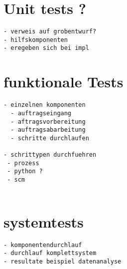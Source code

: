 \section{Unit tests ?}


\begin{verbatim}
- verweis auf grobentwurf?
- hilfskomponenten
- eregeben sich bei impl
\end{verbatim}

\section{funktionale Tests}

\begin{verbatim}
- einzelnen komponenten
  - auftragseingang
  - aftragsvorbereitung
  - auftragsabarbeitung
  - schritte durchlaufen

- schrittypen durchfuehren
 - prozess
 - python ?
 - scm


\end{verbatim}

\section{systemtests}

\begin{verbatim}
- komponentendurchlauf
- durchlauf komplettsystem
- resultate beispiel datenanalyse

\end{verbatim}

